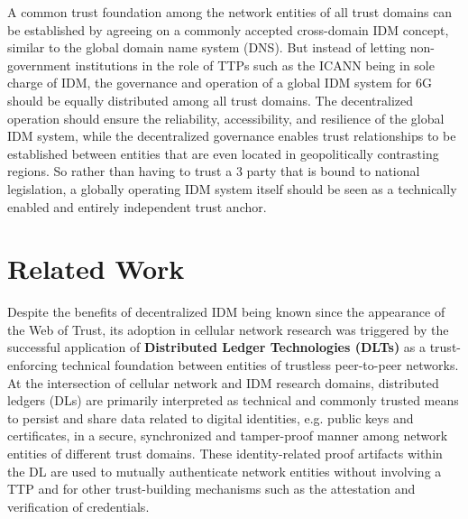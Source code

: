 \documentclass[conference]{IEEEtran}
\begin{document}
A common trust foundation among the network entities of all trust domains can be established by agreeing on a commonly accepted cross-domain IDM concept, similar to the global domain name system (DNS). But instead of letting non-government institutions in the role of TTPs such as the ICANN being in sole charge of IDM, the governance and operation of a global IDM system for 6G should be equally distributed among all trust domains. The decentralized operation should ensure the reliability, accessibility, and resilience of the global IDM system, while the decentralized governance enables trust relationships to be established between entities that are even located in geopolitically contrasting regions. So rather than having to trust a 3 party that is bound to national legislation, a globally operating IDM system itself should be seen as a technically enabled and entirely independent trust anchor.

\section{Related Work}
\label{related}

Despite the benefits of decentralized IDM being known since the appearance of the Web of Trust, its adoption in cellular network research was triggered by the successful application of {\bf{Distributed Ledger Technologies (DLTs)}} as a trust-enforcing technical foundation between entities of trustless peer-to-peer networks. At the intersection of cellular network and IDM research domains, distributed ledgers (DLs) are primarily interpreted as technical and commonly trusted means to persist and share data related to digital identities, e.g. public keys and certificates, in a secure, synchronized and tamper-proof manner among network entities of different trust domains. These identity-related proof artifacts within the DL are used to mutually authenticate network entities without involving a TTP and for other trust-building mechanisms such as the attestation and verification of credentials.    
\end{document}
